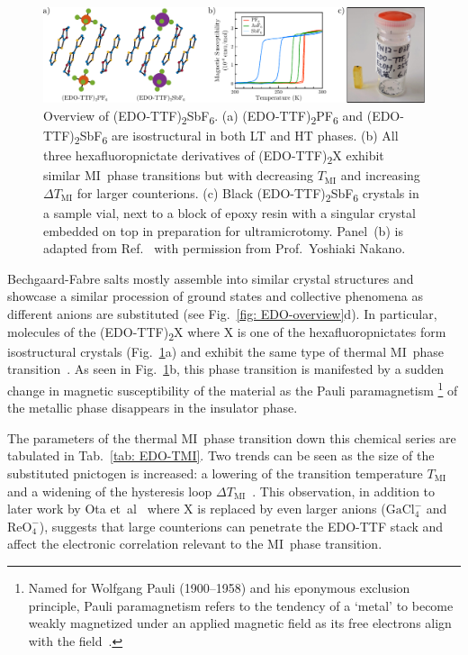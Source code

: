 \begin{figure}[ht!]
  \centering
  \includegraphics[width = \textwidth]{Figures/fig_EDOSb_sample.pdf}
  \caption[Overview of (EDO-TTF)\textsubscript{2}SbF\textsubscript{6}.]{
  Overview of (EDO-TTF)\textsubscript{2}SbF\textsubscript{6}.
  (a) (EDO-TTF)\textsubscript{2}PF\textsubscript{6} and (EDO-TTF)\textsubscript{2}SbF\textsubscript{6}
  are isostructural in both LT and HT phases.
  (b) All three hexafluoropnictate derivatives of (EDO-TTF)\textsubscript{2}X
  exhibit similar MI~phase transitions but with decreasing $T_\text{MI}$ and
  increasing $\Delta T_\text{MI}$ for larger counterions.
  (c) Black (EDO-TTF)\textsubscript{2}SbF\textsubscript{6} crystals
  in a sample vial, next to   a block of epoxy resin with a singular crystal embedded
  on top in preparation for ultramicrotomy.
  Panel~(b) is adapted from Ref.~\cite{NakanoX} with permission
  from Prof.~Yoshiaki Nakano.
  }
  \label{fig: EDOSb-sample}
\end{figure}

Bechgaard-Fabre salts mostly assemble into similar crystal structures and
showcase a similar procession of ground states and collective phenomena
as different anions are substituted (see Fig.~\ref{fig: EDO-overview}d).
%
In particular, molecules of the (EDO-TTF)\textsubscript{2}X where X is one of the hexafluoropnictates
form isostructural crystals (Fig.~\ref{fig: EDOSb-sample}a) and
exhibit the same type of thermal MI~phase transition~\cite{Ota2002, Ota2003, Nakano2009}.
%
As seen in Fig.~\ref{fig: EDOSb-sample}b,
this phase transition is manifested by a sudden change in magnetic susceptibility of the material
as the Pauli paramagnetism%
\footnote{Named for Wolfgang Pauli (1900--1958) and his eponymous exclusion principle,
Pauli paramagnetism refers to the tendency of a `metal' to become weakly magnetized
under an applied magnetic field as its free electrons align with the field~\cite{Nobel1942, AshcroftBook}.}
of the metallic phase disappears in the insulator phase.

The parameters of the thermal MI~phase transition down this chemical series
are tabulated in Tab.~\ref{tab: EDO-TMI}.
Two trends can be seen as the size of the substituted pnictogen is increased:
a lowering of the transition temperature $T_\text{MI}$ and
a widening of the hysteresis loop $\Delta T_\text{MI}$~\cite{NakanoX}.
%
This observation, in addition to later work by Ota et~al~\cite{Ota2006}
where X is replaced by even larger anions ($\mathrm{GaCl_4^-}$ and $\mathrm{ReO_4^-}$),
suggests that large counterions can penetrate the EDO-TTF stack and
affect the electronic correlation relevant to the MI~phase transition.

